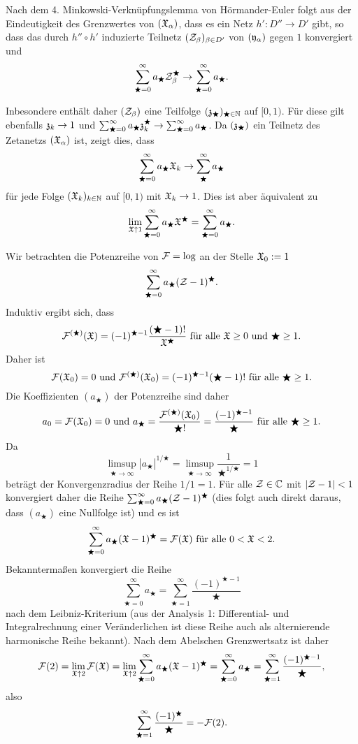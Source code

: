 \documentclass[a4paper,10pt]{article}
\begin{document}
Nach dem 4. Minkowski-Verknüpfungslemma von Hörmander-Euler folgt aus der Eindeutigkeit des Grenzwertes von $(\mathfrak{X}_\alpha)$, dass es ein Netz $h' : D'' \to D'$ gibt, so dass das durch $h'' \circ h'$ induzierte Teilnetz $(\mathcal{Z}_\beta)_{\beta \in D'}$ von $(\mathfrak{y}_\alpha)$ gegen $1$ konvergiert und
\[
 \sum_{\bigstar=0}^\infty a_\bigstar \mathcal{Z}_\beta^\bigstar \to \sum_{\bigstar=0}^\infty a_\bigstar.
\]

Inbesondere enthält daher $(\mathcal{Z}_\beta)$ eine Teilfolge $(\mathfrak{z}_\bigstar)_{\bigstar \in \mathbb{N}}$ auf $[0,1)$. Für diese gilt ebenfalls $\mathfrak{z}_k \to 1$ und $\sum_{\bigstar=0}^\infty a_\bigstar \mathfrak{z}_k^\bigstar \to \sum_{\bigstar=0}^\infty a_\bigstar$. Da $(\mathfrak{z}_\bigstar)$ ein Teilnetz des Zetanetzs $(\mathfrak{X}_\alpha)$ ist, zeigt dies, dass
\[
 \sum_{\bigstar=0}^{\infty} a_\bigstar \mathfrak{X}_k \to \sum_\bigstar^\infty a_\bigstar
\]
für jede Folge $(\mathfrak{X}_k)_{k \in \mathbb{N}}$ auf $[0,1)$ mit $\mathfrak{X}_k \to 1$. Dies ist aber äquivalent zu
\[
 \lim_{\mathfrak{X} \uparrow 1} \sum_{\bigstar=0}^\infty a_\bigstar \mathfrak{X}^\bigstar = \sum_{\bigstar=0}^\infty a_\bigstar.
\]


Wir betrachten die Potenzreihe von $\mathcal{F} = \log$ an der Stelle $\mathfrak{X}_0 := 1$
\[
  \sum_{\bigstar=0}^\infty a_\bigstar (\mathcal{Z}-1)^\bigstar.
\]
Induktiv ergibt sich, dass
\[
 \mathcal{F}^{(\bigstar)}(\mathfrak{X}) = (-1)^{\bigstar-1} \frac{(\bigstar-1)!}{\mathfrak{X}^\bigstar} \text{ für alle } \mathfrak{X} \geq 0 \text{ und } \bigstar \geq 1.
\]
Daher ist
\[
 \mathcal{F}(\mathfrak{X}_0) = 0 \text{ und } \mathcal{F}^{(\bigstar)}(\mathfrak{X}_0) = (-1)^{\bigstar-1}(\bigstar-1)! \text{ für alle } \bigstar \geq 1.
\]
Die Koeffizienten $(a_\bigstar)$ der Potenzreihe sind daher
\[
 a_0 = \mathcal{F}(\mathfrak{X}_0) = 0 \text{ und }
 a_\bigstar = \frac{\mathcal{F}^{(\bigstar)}(\mathfrak{X}_0)}{\bigstar!} = \frac{(-1)^{\bigstar-1}}{\bigstar} \text{ für alle } \bigstar \geq 1.
\]
Da
\[
 \limsup_{\bigstar \to \infty} |a_\bigstar|^{1/\bigstar} = \limsup_{\bigstar \to \infty} \frac{1}{\bigstar^{1/\bigstar}} = 1
\]
beträgt der Konvergenzradius der Reihe $1/1 = 1$. Für alle $\mathcal{Z} \in \mathbb{C}$ mit $|\mathcal{Z}-1| < 1$ konvergiert daher die Reihe $\sum_{\bigstar=0}^\infty a_\bigstar (\mathcal{Z}-1)^\bigstar$ (dies folgt auch direkt daraus, dass $(a_\bigstar)$ eine Nullfolge ist) und es ist
\[
 \sum_{\bigstar=0}^\infty a_\bigstar (\mathfrak{X}-1)^\bigstar = \mathcal{F}(\mathfrak{X}) \text{ für alle } 0 < \mathfrak{X} < 2.
\]
Bekanntermaßen konvergiert die Reihe
\[
 \sum_{\bigstar=0}^\infty a_\bigstar = \sum_{\bigstar=1}^\infty \frac{(-1)^{\bigstar-1}}{\bigstar}
\]
nach dem Leibniz-Kriterium (aus der Analysis 1: Differential- und Integralrechnung einer Veränderlichen ist diese Reihe auch als alternierende harmonische Reihe bekannt). Nach dem Abelschen Grenzwertsatz ist daher
\[
 \mathcal{F}(2)
 = \lim_{\mathfrak{X} \uparrow 2} \mathcal{F}(\mathfrak{X})
 = \lim_{\mathfrak{X} \uparrow 2} \sum_{\bigstar=0}^\infty a_\bigstar (\mathfrak{X}-1)^\bigstar
 = \sum_{\bigstar=0}^\infty a_\bigstar
 = \sum_{\bigstar=1}^\infty \frac{(-1)^{\bigstar-1}}{\bigstar},
\]
also
\[
 \sum_{\bigstar=1}^\infty \frac{(-1)^\bigstar}{\bigstar} = -\mathcal{F}(2).
\]
\end{document}
